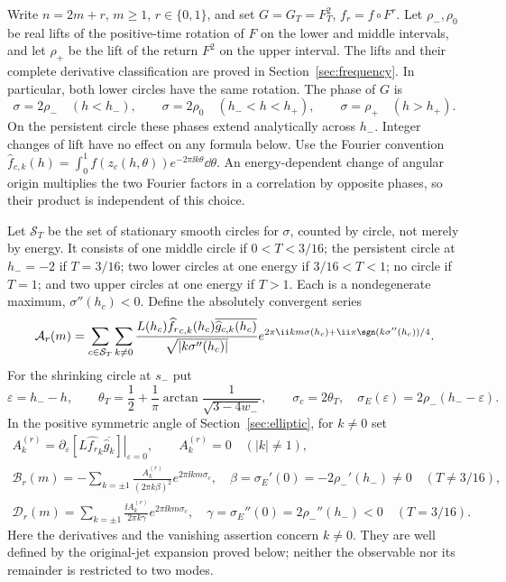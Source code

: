 Write $n=2m+r$, $m\ge1$, $r\in\{0,1\}$, and set $G=G_T=F_T^2$,
$f_r=f\circ F^r$. Let $\rho_-,\rho_0$ be real lifts of the
positive-time rotation of $F$ on the lower and middle intervals,
and let $\rho_+$ be the lift of the return $F^2$ on the upper
interval. The lifts and their complete derivative classification
are proved in Section~\ref{sec:frequency}. In particular, both
lower circles have the same rotation. The phase of $G$ is
\begin{equation}
 \sigma=2\rho_-\quad(h<h_-),\qquad
 \sigma=2\rho_0\quad(h_-<h<h_+),\qquad
 \sigma=\rho_+\quad(h>h_+).
 \label{eq:frequency-lifts}
\end{equation}
On the persistent circle these phases extend analytically across $h_-$.
Integer changes of lift have no effect on any formula below.
Use the Fourier convention
$\widehat f_{c,k}(h)=\int_0^1 f(z_c(h,\theta))e^{-2\pi\ii k\theta}\dd\theta$.
An energy-dependent change of angular origin multiplies the two
Fourier factors in a correlation by opposite phases, so their product
is independent of this choice.

Let $\mathcal S_T$ be the set of stationary smooth circles for
$\sigma$, counted by circle, not merely by energy. It consists of
one middle circle if $0<T<3/16$; the persistent circle at $h_-=-2$
if $T=3/16$; two lower circles at one energy if $3/16<T<1$;
no circle if $T=1$; and two upper circles at one energy if $T>1$.
Each is a nondegenerate maximum, $\sigma''(h_c)<0$.
Define the absolutely convergent series
\begin{equation}
 \mathcal A_r(m)=\sum_{c\in\mathcal S_T}\sum_{k\ne0}
 \frac{L(h_c)\widehat{f_r}_{c,k}(h_c)
       \overline{\widehat g_{c,k}(h_c)}}{\sqrt{|k\sigma''(h_c)|}}
 e^{2\pi\ii km\sigma(h_c)+\ii\pi\sgn(k\sigma''(h_c))/4}.
 \label{eq:stationary-coefficient}
\end{equation}
For the shrinking circle at $s_-$ put
\[
 \varepsilon=h_--h,\qquad
 \theta_T=\frac12+\frac1\pi\arctan\frac1{\sqrt{3-4w_-}},\qquad
 \sigma_c=2\theta_T,\quad \sigma_E(\varepsilon)=2\rho_-(h_--\varepsilon).
\]
In the positive symmetric angle of Section~\ref{sec:elliptic}, for $k\ne0$ set
\begin{equation}
\begin{gathered}
 A_k^{(r)}=\left.\partial_\varepsilon
       \left[L\widehat{f_r}_k\overline{\widehat g_k}\right]
       \right|_{\varepsilon=0},\qquad A_k^{(r)}=0\quad(|k|\ne1),\\
 \mathcal B_r(m)=-\sum_{k=\pm1}
       \frac{A_k^{(r)}}{(2\pi k\beta)^2}e^{2\pi\ii km\sigma_c},
 \quad \beta=\sigma_E'(0)=-2\rho_-'(h_-)\ne0
       \quad(T\ne3/16),\\
 \mathcal D_r(m)=\sum_{k=\pm1}
       \frac{\ii A_k^{(r)}}{2\pi k\gamma}e^{2\pi\ii km\sigma_c},
 \quad \gamma=\sigma_E''(0)=2\rho_-''(h_-)<0
       \quad(T=3/16).
\end{gathered}
\label{eq:center-coefficients}
\end{equation}
Here the derivatives and the vanishing assertion concern $k\ne0$.
They are well defined by the original-jet expansion proved below;
neither the observable nor its remainder is restricted to two modes.

